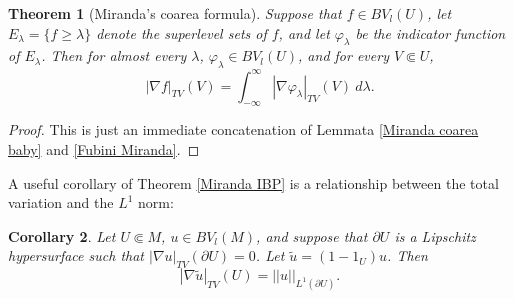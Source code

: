 \documentclass[reqno,12pt,letterpaper]{amsart}
\newtheorem{theorem}{Theorem}[section]
\newtheorem{corollary}[theorem]{Corollary}
\theoremstyle{definition}
\numberwithin{equation}{section}
\begin{document}
\begin{theorem}[Miranda's coarea formula]\label{Miranda coarea}
Suppose that $f \in BV_l(U)$, let $E_\lambda = \{f \geq \lambda\}$ denote the superlevel sets of $f$, and let $\varphi_\lambda$ be the indicator function of $E_\lambda$.
Then for almost every $\lambda$, $\varphi_\lambda \in BV_l(U)$, and for every $V \Subset U$,
$$|\nabla f|_{TV}(V) = \int_{-\infty}^\infty |\nabla \varphi_\lambda|_{TV}(V) ~d\lambda.$$
\end{theorem}
\begin{proof}
This is just an immediate concatenation of Lemmata \ref{Miranda coarea baby} and \ref{Fubini Miranda}.
\end{proof}


A useful corollary of Theorem \ref{Miranda IBP} is a relationship between the total variation and the $L^1$ norm:
\begin{corollary}\label{IBP TV}
Let $U \Subset M$, $u \in BV_l(M)$, and suppose that $\partial U$ is a Lipschitz hypersurface such that $|\nabla u|_{TV}(\partial U) = 0$.
Let $\tilde u = (1 - 1_U)u$. Then
$$|\nabla \tilde u|_{TV}(U) = ||u||_{L^1(\partial U)}.$$
\end{corollary}
\end{document}
